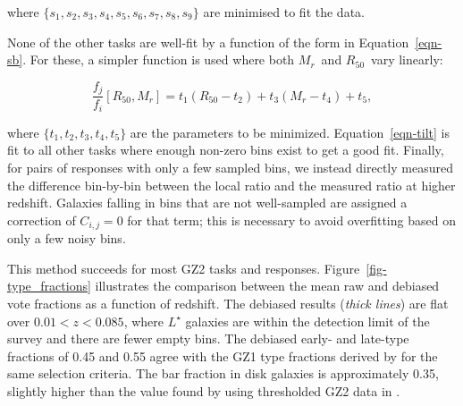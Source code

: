 \documentclass[useAMS,usenatbib]{mn2e}
\newcommand{\mr}{$M_r$}
\newcommand{\rfifty}{$R_{50}$}
\begin{document}
\noindent where $\{s_1,s_2,s_3,s_4,s_5,s_6,s_7,s_8,s_9\}$ are minimised to fit the data. %

None of the other tasks are well-fit by a function of the form in Equation~\ref{eqn-sb}. For these, a simpler function is used where both \mr~and \rfifty~vary linearly:

\begin{equation}
\frac{f_j}{f_i}[R_{50},M_r] = t_1(R_{50} - t_2) + t_3(M_r - t_4) + t_5,
\label{eqn-tilt}
\end{equation}

\noindent where $\{t_1,t_2,t_3,t_4,t_5\}$ are the parameters to be minimized. Equation~\ref{eqn-tilt} is fit to all other tasks where enough non-zero bins exist to get a good fit. Finally, for pairs of responses with only a few sampled bins, we instead directly measured the difference bin-by-bin between the local ratio and the measured ratio at higher redshift. Galaxies falling in bins that are not well-sampled are assigned a correction of $C_{i,j}=0$ for that term; this is necessary to avoid overfitting based on only a few noisy bins. 



This method succeeds for most GZ2 tasks and responses. Figure~\ref{fig-type_fractions} illustrates the comparison between the mean raw and debiased vote fractions as a function of redshift. The debiased results ({\it thick lines}) are flat over $0.01<z<0.085$, where $L^\star$ galaxies \citep[$M_r\sim-20.44$;][]{bla03a} are within the detection limit of the survey and there are fewer empty bins. The debiased early- and late-type fractions of 0.45 and 0.55 agree with the GZ1 type fractions derived by \citet{bam09} for the same selection criteria. The bar fraction in disk galaxies is approximately 0.35, slightly higher than the value found by using thresholded GZ2 data in \citet{mas11c}.
\end{document}
